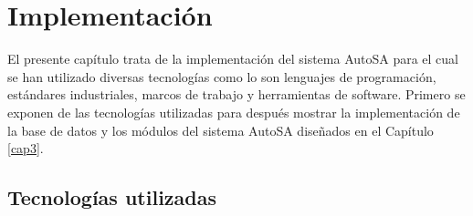 \chapter{Implementación}\label{cap4}
El presente capítulo trata de la implementación del sistema AutoSA para el cual se han utilizado diversas tecnologías como lo son lenguajes de programación, estándares industriales, marcos de trabajo y herramientas de software. Primero se exponen de las tecnologías utilizadas para después mostrar la implementación de la base de datos y los módulos del sistema AutoSA diseñados en el Capítulo \ref{cap3}.
\section{Tecnologías utilizadas}
